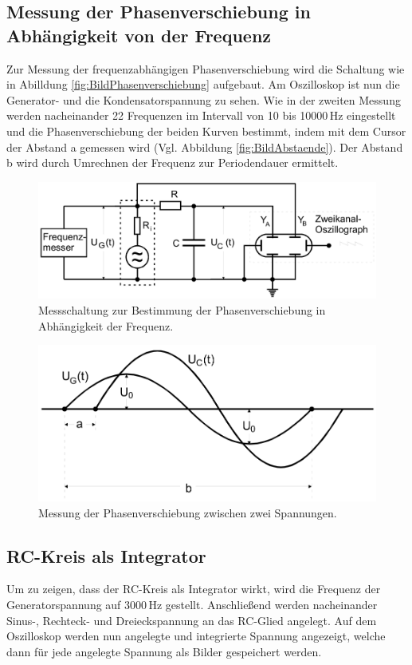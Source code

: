 \subsection{Messung der Phasenverschiebung in Abhängigkeit von der Frequenz}
Zur Messung der frequenzabhängigen Phasenverschiebung wird die Schaltung wie in Abilldung \eqref{fig:BildPhasenverschiebung} aufgebaut. 
Am Oszilloskop ist nun die Generator- und die Kondensatorspannung zu sehen. Wie in der zweiten Messung werden nacheinander 22 Frequenzen im Intervall 
von 10 bis 10000\,Hz eingestellt und die Phasenverschiebung der beiden Kurven bestimmt, indem mit dem Cursor der Abstand a gemessen wird 
(Vgl. Abbildung \eqref{fig:BildAbstaende}). Der Abstand b wird durch Umrechnen der Frequenz zur Periodendauer ermittelt. 
\begin{figure}[h!]
\centering
\includegraphics[scale=.45]{Schaltung_Phasenverschiebung.png}
\caption{Messschaltung zur Bestimmung der Phasenverschiebung in Abhängigkeit der Frequenz.}
\label{fig:BildPhasenverschiebung}
\end{figure}

\begin{figure}[h!]
\centering
\includegraphics[scale=.55]{Abstaende.png}
\caption{Messung der Phasenverschiebung zwischen zwei Spannungen.}
\label{fig:BildAbstaende}
\end{figure}

\subsection{RC-Kreis als Integrator}
Um zu zeigen, dass der RC-Kreis als Integrator wirkt, wird die Frequenz der Generatorspannung auf 3000\,Hz gestellt. Anschließend
werden nacheinander Sinus-, Rechteck- und Dreieckspannung an das RC-Glied angelegt. Auf dem Oszilloskop werden nun angelegte und
integrierte Spannung angezeigt, welche dann für jede angelegte Spannung als Bilder gespeichert werden.
